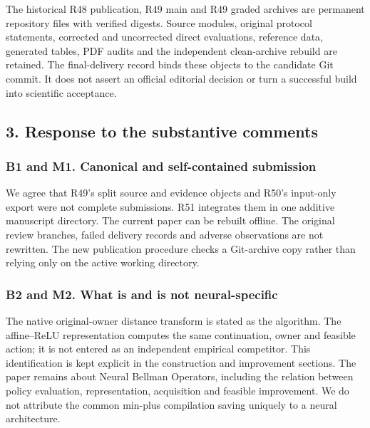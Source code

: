 \documentclass[ecta,nameyear,draft]{econsocart}
\begin{document}
The historical R48 publication, R49 main and R49 graded archives are
permanent repository files with verified digests. Source modules,
original protocol statements, corrected and uncorrected direct
evaluations, reference data, generated tables, PDF audits and the
independent clean-archive rebuild are retained. The final-delivery
record binds these objects to the candidate Git commit. It does not
assert an official editorial decision or turn a successful build into
scientific acceptance.

\hypertarget{response-to-the-substantive-comments}{%
\subsection{3. Response to the substantive
comments}\label{response-to-the-substantive-comments}}

\hypertarget{b1-and-m1.-canonical-and-self-contained-submission}{%
\subsubsection{B1 and M1. Canonical and self-contained
submission}\label{b1-and-m1.-canonical-and-self-contained-submission}}

We agree that R49's split source and evidence objects and R50's
input-only export were not complete submissions. R51 integrates them in
one additive manuscript directory. The current paper can be rebuilt
offline. The original review branches, failed delivery records and
adverse observations are not rewritten. The new publication procedure
checks a Git-archive copy rather than relying only on the active working
directory.

\hypertarget{b2-and-m2.-what-is-and-is-not-neural-specific}{%
\subsubsection{B2 and M2. What is and is not
neural-specific}\label{b2-and-m2.-what-is-and-is-not-neural-specific}}

The native original-owner distance transform is stated as the algorithm.
The affine--ReLU representation computes the same continuation, owner
and feasible action; it is not entered as an independent empirical
competitor. This identification is kept explicit in the construction and
improvement sections. The paper remains about Neural Bellman Operators,
including the relation between policy evaluation, representation,
acquisition and feasible improvement. We do not attribute the common
min-plus compilation saving uniquely to a neural architecture.
\end{document}
